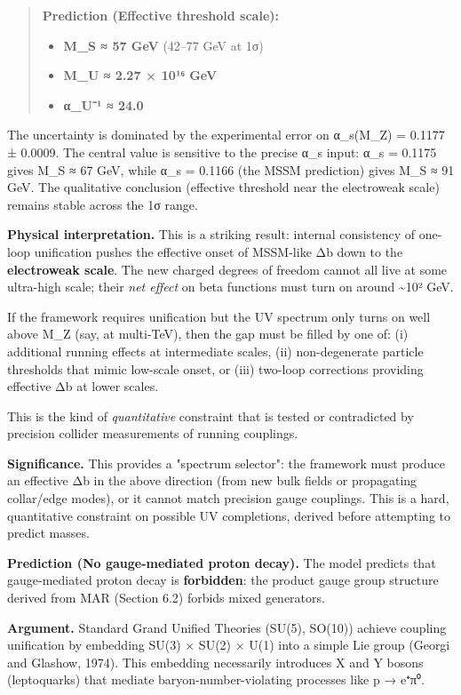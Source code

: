 \begin{quote}
\textbf{Prediction (Effective threshold scale):}

\begin{itemize}
\tightlist
\item
  \textbf{M\_S ≈ 57 GeV} (42--77 GeV at 1σ)
\item
  \textbf{M\_U ≈ 2.27 × 10¹⁶ GeV}
\item
  \textbf{α\_U⁻¹ ≈ 24.0}
\end{itemize}
\end{quote}

The uncertainty is dominated by the experimental error on α\_s(M\_Z) = 0.1177 ± 0.0009. The central value is sensitive to the precise α\_s input: α\_s = 0.1175 gives M\_S ≈ 67 GeV, while α\_s = 0.1166 (the MSSM prediction) gives M\_S ≈ 91 GeV. The qualitative conclusion (effective threshold near the electroweak scale) remains stable across the 1σ range.

\textbf{Physical interpretation.} This is a striking result: internal consistency of one-loop unification pushes the effective onset of MSSM-like Δb down to the \textbf{electroweak scale}. The new charged degrees of freedom cannot all live at some ultra-high scale; their \emph{net effect} on beta functions must turn on around \textasciitilde10² GeV.

If the framework requires unification but the UV spectrum only turns on well above M\_Z (say, at multi-TeV), then the gap must be filled by one of: (i) additional running effects at intermediate scales, (ii) non-degenerate particle thresholds that mimic low-scale onset, or (iii) two-loop corrections providing effective Δb at lower scales.

This is the kind of \emph{quantitative} constraint that is tested or contradicted by precision collider measurements of running couplings.

\textbf{Significance.} This provides a "spectrum selector": the framework must produce an effective Δb in the above direction (from new bulk fields or propagating collar/edge modes), or it cannot match precision gauge couplings. This is a hard, quantitative constraint on possible UV completions, derived before attempting to predict masses.

\textbf{Prediction (No gauge-mediated proton decay).} The model predicts that gauge-mediated proton decay is \textbf{forbidden}: the product gauge group structure derived from MAR (Section 6.2) forbids mixed generators.

\textbf{Argument.} Standard Grand Unified Theories (SU(5), SO(10)) achieve coupling unification by embedding SU(3) × SU(2) × U(1) into a simple Lie group (Georgi and Glashow, 1974). This embedding necessarily introduces X and Y bosons (leptoquarks) that mediate baryon-number-violating processes like p → e⁺π⁰.

